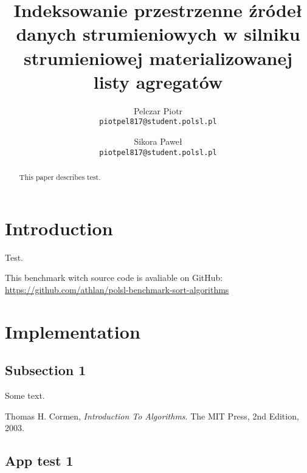 \documentclass[12pt]{article}
\title{Indeksowanie przestrzenne źródeł danych strumieniowych w silniku strumieniowej materializowanej listy agregatów}
\author{
	  Pelczar Piotr\\
	  \small{\texttt{piotpel817@student.polsl.pl}}
	  \and
	  Sikora Paweł\\
	  \small{\texttt{piotpel817@student.polsl.pl}}
	}
\date{\displaydate{date}}
\begin{document}
\maketitle
 
\begin{abstract}
This paper describes test.
\end{abstract}

\renewcommand{\contentsname}{Contents}

\newpage
\tableofcontents

\newpage
\section{Introduction}
\label{sec:intro}

Test.

This benchmark witch source code is avaliable on GitHub:\\
\url{https://github.com/athlan/polsl-benchmark-sort-algorithms}

\section{Implementation}
\subsection{Subsection 1}

Some text.

\newpage
\begin{thebibliography}{9}

  Thomas H. Cormen,
  \emph{Introduction To Algorithms}.
  The MIT Press,
  2nd Edition,
  2003.

\end{thebibliography}

\begin{appendices}
	\section{App test 1}
	\label{app:appTest1}

\end{appendices}
\end{document}
